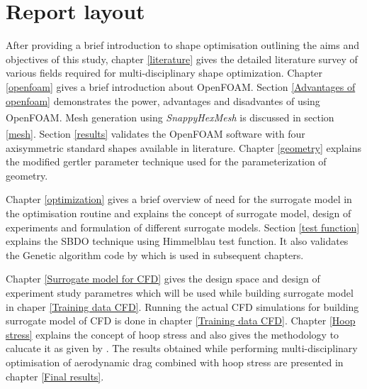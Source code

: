 \section{Report layout}
\label{layout}

After providing a brief introduction to shape optimisation outlining the aims and objectives of this study, chapter \ref{literature} gives the detailed literature survey of various fields required for multi-disciplinary shape optimization. Chapter \ref{openfoam} gives a brief introduction about OpenFOAM. Section \ref{Advantages of openfoam} demonstrates the power, advantages and disadvantes of using OpenFOAM\textsuperscript{\textregistered}.
Mesh generation using \textit{SnappyHexMesh} is discussed in section \ref{mesh}. Section \ref{results} validates the OpenFOAM\textsuperscript{\textregistered} software with four axisymmetric standard shapes available in literature. Chapter \ref{geometry}  explains the modified gertler parameter technique used for the parameterization of geometry.

Chapter \ref{optimization} gives a brief overview of need for the surrogate model in the optimisation routine and explains the concept of surrogate model, design of experiments and formulation of different surrogate models. Section \ref{test function} explains the SBDO technique using Himmelblau test function. It also validates the Genetic algorithm code by \cite{Xavier} which is used in subsequent chapters.

Chapter \ref{Surrogate model for CFD} gives the design space and design of experiment study parametres which will be used while building surrogate model in chaper \ref{Training data CFD}. Running the actual CFD simulations for building surrogate model of CFD is done in chapter \ref{Training data CFD}. Chapter \ref{Hoop stress} explains the concept of hoop stress and also gives the methodology to calucate it as given by \cite{alam2017thesis}. The results obtained while performing multi-disciplinary optimisation of aerodynamic drag combined with hoop stress are presented in chapter \ref{Final results}.

